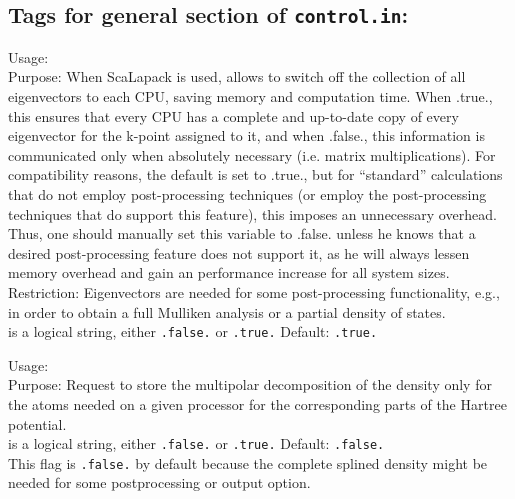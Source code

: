 \newpage

\subsection*{Tags for general section of \texttt{control.in}:}

{
  \noindent
  Usage:   \\[1.0ex]
  Purpose: When ScaLapack is used, allows to switch off the collection
    of all eigenvectors to each CPU, saving memory and computation
    time.  When .true., this ensures that every CPU has a complete and 
    up-to-date copy of every eigenvector for the k-point assigned to it,
    and when .false., this information is communicated only when absolutely
    necessary (i.e. matrix multiplications).  For compatibility reasons, 
    the default is set to .true., but for ``standard'' calculations that 
    do not employ post-processing techniques (or employ the post-processing 
    techniques that do support this feature), this imposes an unnecessary 
    overhead.  Thus, one should manually set this variable to .false. 
    unless he knows that a desired post-processing feature does not support 
    it, as he will always lessen memory overhead and gain an performance 
    increase for all system sizes.  \\[1.0ex] 
  Restriction: Eigenvectors are needed for some post-processing
    functionality, e.g., in order to obtain a full Mulliken analysis
    or a partial density of states. \\[1.0ex]
   is a logical string, either \texttt{.false.} or
    \texttt{.true.} Default: \texttt{.true.} \\
}

{
  \noindent
  Usage:   \\[1.0ex]
  Purpose: Request to store the multipolar decomposition of the density only for
  the atoms needed on a given processor for the corresponding parts of the
  Hartree potential.
  \\[1.0ex]
   is a logical string, either \texttt{.false.} or
    \texttt{.true.} Default: \texttt{.false.}  \\
}
This flag is \texttt{.false.} by default because the complete splined density
might be needed for some postprocessing or output option.


